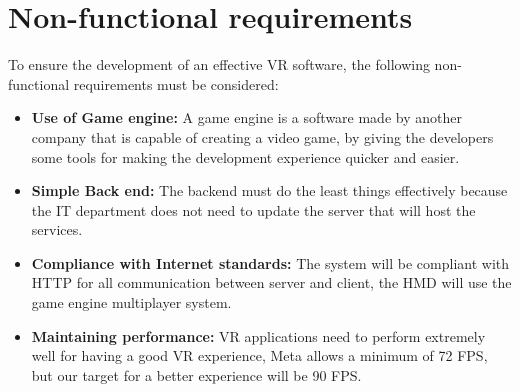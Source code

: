 \section{Non-functional requirements}
\noindent
To ensure the development of an effective \ac{VR} software, the following non-functional requirements must be considered:

\begin{itemize}
  \item \textbf{Use of Game engine:} A game engine is a software made by another company that is capable of creating a video game, by giving the developers some tools for making the development experience quicker and easier.
  \item \textbf{Simple Back end:} The backend must do the least things effectively because the IT department does not need to update the server that will host the services.
  \item \textbf{Compliance with Internet standards:} The system will be compliant with \ac{HTTP} for all communication between server and client, the \ac{HMD} will use the game engine multiplayer system.
  \item \textbf{Maintaining performance:} \ac{VR} applications need to perform extremely well for having a good \ac{VR} experience, Meta allows a minimum of 72 \ac{FPS}, but our target for a better experience will be 90 \ac{FPS}.
\end{itemize}

